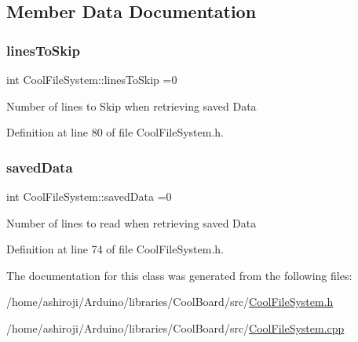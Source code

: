 \subsection{Member Data Documentation}
\mbox{\label{class_cool_file_system_a84fdb6057e534b395512463daa28ea3c}} 
\subsubsection{\texorpdfstring{lines\+To\+Skip}{linesToSkip}}
{\footnotesize\ttfamily int Cool\+File\+System\+::lines\+To\+Skip =0\hspace{0.3cm}{\ttfamily [private]}}

Number of lines to Skip when retrieving saved Data 

Definition at line 80 of file Cool\+File\+System.\+h.

\mbox{\label{class_cool_file_system_ad9f5b739a32100f5f21270c3d9ee2b1d}} 
\subsubsection{\texorpdfstring{saved\+Data}{savedData}}
{\footnotesize\ttfamily int Cool\+File\+System\+::saved\+Data =0\hspace{0.3cm}{\ttfamily [private]}}

Number of lines to read when retrieving saved Data 

Definition at line 74 of file Cool\+File\+System.\+h.



The documentation for this class was generated from the following files\+:\begin{DoxyCompactItemize}
\item 
/home/ashiroji/\+Arduino/libraries/\+Cool\+Board/src/\hyperlink{_cool_file_system_8h}{Cool\+File\+System.\+h}\item 
/home/ashiroji/\+Arduino/libraries/\+Cool\+Board/src/\hyperlink{_cool_file_system_8cpp}{Cool\+File\+System.\+cpp}\end{DoxyCompactItemize}
